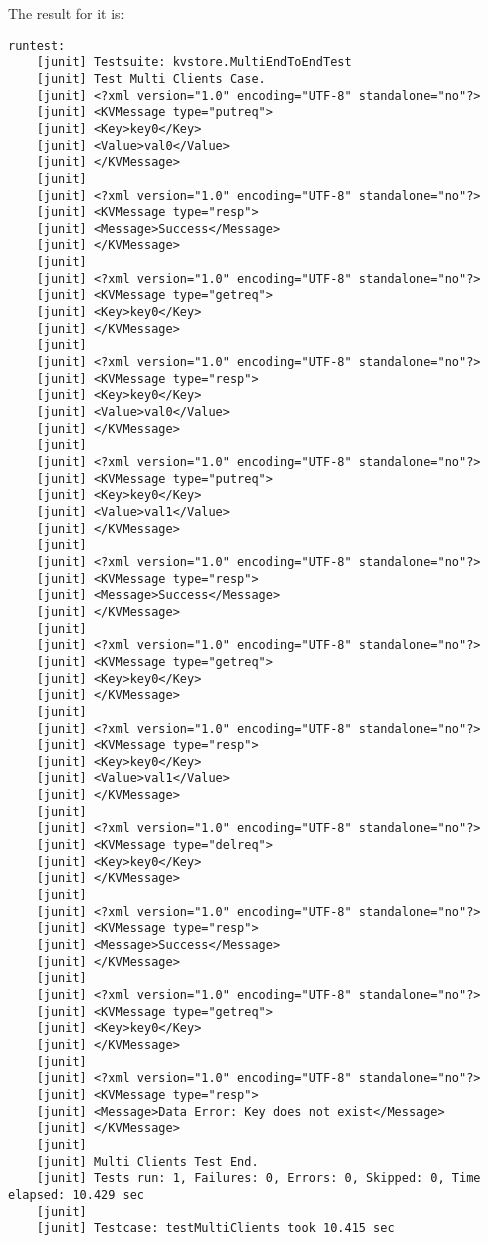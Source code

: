 \documentclass{article}
\begin{document}
The result for it is:
\begin{lstlisting}
runtest:
    [junit] Testsuite: kvstore.MultiEndToEndTest
    [junit] Test Multi Clients Case.
    [junit] <?xml version="1.0" encoding="UTF-8" standalone="no"?>
    [junit] <KVMessage type="putreq">
    [junit] <Key>key0</Key>
    [junit] <Value>val0</Value>
    [junit] </KVMessage>
    [junit] 
    [junit] <?xml version="1.0" encoding="UTF-8" standalone="no"?>
    [junit] <KVMessage type="resp">
    [junit] <Message>Success</Message>
    [junit] </KVMessage>
    [junit] 
    [junit] <?xml version="1.0" encoding="UTF-8" standalone="no"?>
    [junit] <KVMessage type="getreq">
    [junit] <Key>key0</Key>
    [junit] </KVMessage>
    [junit] 
    [junit] <?xml version="1.0" encoding="UTF-8" standalone="no"?>
    [junit] <KVMessage type="resp">
    [junit] <Key>key0</Key>
    [junit] <Value>val0</Value>
    [junit] </KVMessage>
    [junit] 
    [junit] <?xml version="1.0" encoding="UTF-8" standalone="no"?>
    [junit] <KVMessage type="putreq">
    [junit] <Key>key0</Key>
    [junit] <Value>val1</Value>
    [junit] </KVMessage>
    [junit] 
    [junit] <?xml version="1.0" encoding="UTF-8" standalone="no"?>
    [junit] <KVMessage type="resp">
    [junit] <Message>Success</Message>
    [junit] </KVMessage>
    [junit] 
    [junit] <?xml version="1.0" encoding="UTF-8" standalone="no"?>
    [junit] <KVMessage type="getreq">
    [junit] <Key>key0</Key>
    [junit] </KVMessage>
    [junit] 
    [junit] <?xml version="1.0" encoding="UTF-8" standalone="no"?>
    [junit] <KVMessage type="resp">
    [junit] <Key>key0</Key>
    [junit] <Value>val1</Value>
    [junit] </KVMessage>
    [junit] 
    [junit] <?xml version="1.0" encoding="UTF-8" standalone="no"?>
    [junit] <KVMessage type="delreq">
    [junit] <Key>key0</Key>
    [junit] </KVMessage>
    [junit] 
    [junit] <?xml version="1.0" encoding="UTF-8" standalone="no"?>
    [junit] <KVMessage type="resp">
    [junit] <Message>Success</Message>
    [junit] </KVMessage>
    [junit] 
    [junit] <?xml version="1.0" encoding="UTF-8" standalone="no"?>
    [junit] <KVMessage type="getreq">
    [junit] <Key>key0</Key>
    [junit] </KVMessage>
    [junit] 
    [junit] <?xml version="1.0" encoding="UTF-8" standalone="no"?>
    [junit] <KVMessage type="resp">
    [junit] <Message>Data Error: Key does not exist</Message>
    [junit] </KVMessage>
    [junit] 
    [junit] Multi Clients Test End.
    [junit] Tests run: 1, Failures: 0, Errors: 0, Skipped: 0, Time elapsed: 10.429 sec
    [junit] 
    [junit] Testcase: testMultiClients took 10.415 sec
\end{lstlisting}
\end{document}
